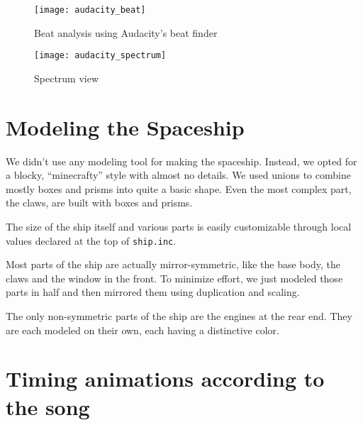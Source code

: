 \documentclass[a4paper, 12pt]{scrartcl}
\begin{document}
    \begin{figure}[H]
        \centering
        \texttt{[image: audacity\_beat]}
        \caption{Beat analysis using Audacity's beat finder}
        \label{fig:beat}
    \end{figure}

    \begin{figure}[H]
        \centering
        \texttt{[image: audacity\_spectrum]}
        \caption{Spectrum view}
        \label{fig:spectrogram}
    \end{figure}

    \section{Modeling the Spaceship}
    We didn't use any modeling tool for making the spaceship. Instead, we opted for a blocky, ``minecrafty'' style with almost no details. We used unions to combine mostly boxes and prisms into quite a basic shape. Even the most complex part, the claws, are built with boxes and prisms.

    The size of the ship itself and various parts is easily customizable through local values declared at the top of \texttt{ship.inc}.

    Most parts of the ship are actually mirror-symmetric, like the base body, the claws and the window in the front. To minimize effort, we just modeled those parts in half and then mirrored them using duplication and scaling.

    The only non-symmetric parts of the ship are the engines at the rear end. They are each modeled on their own, each having a distinctive color.

    \section{Timing animations according to the song}
\end{document}
